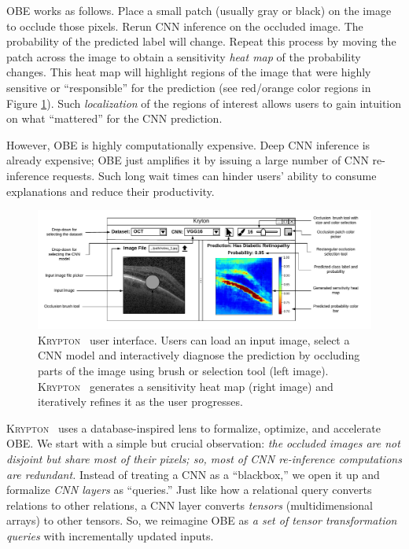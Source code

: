 \documentclass{article}
\newcommand{\system}{\textsc{Krypton}}
\begin{document}
OBE works as follows. Place a small patch (usually gray or black) on the image to occlude those pixels. Rerun CNN inference on the occluded image. The probability of the predicted label will change. Repeat this process by moving the patch across the image to obtain a sensitivity \textit{heat map} of the probability changes. This heat map will highlight regions of the image that were highly sensitive or ``responsible'' for the prediction (see red/orange color regions in Figure \ref{img:ui}). Such \textit{localization} of the regions of interest allows users to gain intuition on what ``mattered'' for the CNN prediction.

However, OBE is highly computationally expensive. Deep CNN inference is already expensive; OBE just amplifies it by issuing a large number of CNN re-inference requests. Such long wait times can hinder users' ability to consume explanations and reduce their productivity.

\begin{figure}[t]\label{img:ui}
\includegraphics[width=\textwidth]{images/ui_mockup.pdf}
\vspace{-10mm}
\caption{\system~ user interface. Users can load an input image, select a CNN model and interactively diagnose the prediction by occluding parts of the image using brush or selection tool (left image). \system~ generates a sensitivity heat map (right image) and iteratively refines it as the user progresses.}
\vspace{-5mm}
\end{figure}

\system~ uses a database-inspired lens to formalize, optimize, and accelerate OBE. We start with a simple but crucial observation: \textit{the occluded images are not disjoint but share most of their pixels; so, most of CNN re-inference computations are redundant.} Instead of treating a CNN as a ``blackbox,'' we open it up and formalize \textit{CNN layers} as ``queries.'' Just like how a relational query converts relations to other relations, a CNN layer converts \textit{tensors} (multidimensional arrays) to other tensors. So, we reimagine OBE as \textit{a set of tensor transformation queries} with incrementally updated inputs.
\end{document}
